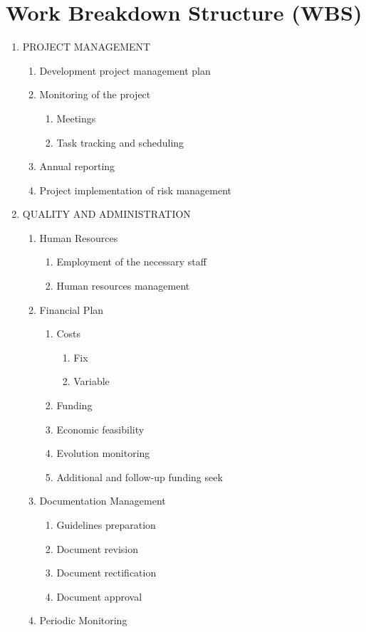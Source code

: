 \chapter{Work Breakdown Structure (WBS)}

\begin{enumerate}[label*=\arabic*.]
	\item PROJECT MANAGEMENT
	
	\begin{enumerate}[label*=\arabic*.]
		\item Development project management plan
		\item Monitoring of the project
		\begin{enumerate}[label*=\arabic*.]
			\item Meetings
			\item Task tracking and scheduling
		\end{enumerate}
		\item Annual reporting
		\item Project implementation of risk management
	\end{enumerate}
	
	\item QUALITY AND ADMINISTRATION
	\begin{enumerate}[label*=\arabic*.]
		\item Human Resources
		\begin{enumerate}[label*=\arabic*.]
			\item Employment of the necessary staff
			\item Human resources management
		\end{enumerate}
		\item Financial Plan
		\begin{enumerate}[label*=\arabic*.]
			\item Costs
			\begin{enumerate}[label*=\arabic*.]
				\item Fix
				\item Variable
			\end{enumerate}
			\item Funding
			\item Economic feasibility
			\item Evolution monitoring
			\item Additional and follow-up funding seek
		\end{enumerate}
		\item Documentation Management
		\begin{enumerate}[label*=\arabic*.]
			\item Guidelines preparation
			\item Document revision
			\item Document rectification
			\item Document approval
		\end{enumerate}
		\item Periodic Monitoring
	\end{enumerate}


\end{enumerate}
